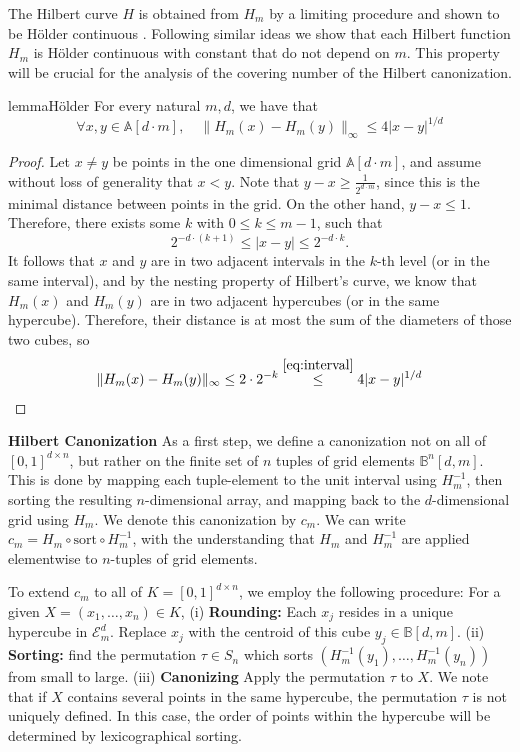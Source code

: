 \documentclass{article}
\begin{document}
The Hilbert curve $H$ is obtained from $H_m$ by a limiting procedure and shown to be Hölder continuous \cite{Hilbert}. Following similar ideas we show that each Hilbert function $H_m$ is Hölder continuous with constant that do not depend on $m$. This property will be crucial for the analysis of the covering number of the Hilbert canonization.
\begin{restatable}{lemma}{Hölder}\label{lem:Hölder}
For every natural $m,d$, we have that 
$$\forall x,y\in \mathbb{A}[d\cdot m], \quad  \|H_m(x)-H_m(y)\|_\infty \leq 4|x-y|^{1/d} $$
\end{restatable}
\begin{proof}
    Let $x\neq y$ be points in the one dimensional grid $\mathbb{A}[d\cdot m]$, and assume without loss of generality that $x<y$. Note that $y-x\geq \frac{1}{2^{d\cdot m}}$, since this is the minimal distance between points in the grid. On the other hand, $y-x\leq 1$. Therefore, there exists some $k$ with $0\leq k \leq m-1 $, such that 
    \begin{equation}\label{eq:interval} 
    2^{-d\cdot (k+1)}\leq |x-y|\leq 2^{-d \cdot k}.
    \end{equation}
   It follows that $x$ and $y$ are in two adjacent intervals in the $k$-th level (or in the same interval), and by the nesting property of Hilbert's curve, we know that $H_m(x)$ and $H_m(y)$ are in two adjacent hypercubes (or in the same hypercube). Therefore, their distance is at most the sum of the diameters of those two cubes, so
    \begin{align*}
    \|H_m(x)-H_m(y)\|_\infty\leq 2\cdot 2^{-k}\stackrel{\eqref{eq:interval}}{\leq} 4|x-y|^{1/d}
    \end{align*}
\end{proof}



\textbf{Hilbert Canonization}
As a first step, we define a canonization not on all of $[0,1]^{d\times n}$, but rather on the finite set of $n$ tuples of grid elements $\mathbb{B}^n[d,m] $. This is done by mapping each tuple-element to the unit interval using $H_m^{-1} $, then sorting the resulting $n$-dimensional array, and mapping back to the $d$-dimensional grid using $H_m$. We denote this canonization by $c_m$. We can write $c_m=H_m \circ \mathrm{sort}\circ H_m^{-1}$, with the understanding that $H_m$ and  $H_m^{-1} $ are applied elementwise to $n$-tuples of grid elements. 

To extend $c_m$ to all of $K=[0,1]^{d\times n}$, we employ the following procedure: For a given $X=(x_1,\ldots,x_n)\in K  $, (i) \textbf{Rounding:} Each $x_j$ resides in a unique hypercube in $ \mathcal{E}_m^d$. Replace $x_j$ with the centroid of this cube $y_j\in \mathbb{B}[d,m] $. (ii) \textbf{Sorting:} find the permutation $\tau \in S_n$ which sorts $\left(H_m^{-1}(y_1),\ldots,H_m^{-1}(y_n) \right)$ from small to large. (iii) \textbf{Canonizing} Apply the permutation $\tau$ to $X$. We note that if $X$ contains several points in the same hypercube, the permutation $\tau$ is not uniquely defined. In this case, the order of points within the hypercube will be determined by lexicographical sorting. 
\end{document}

